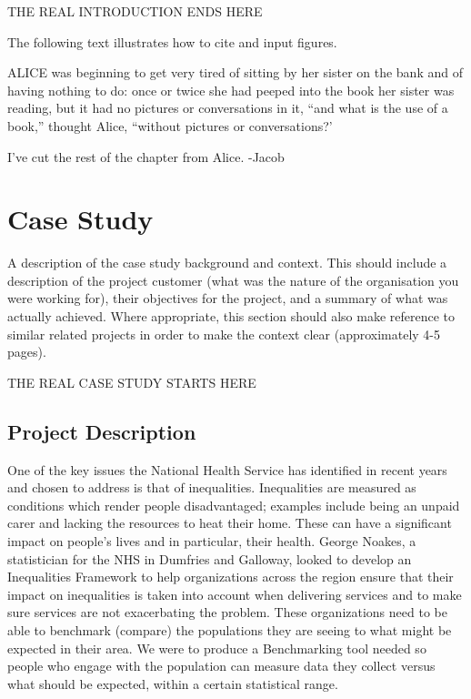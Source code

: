 \documentclass{l3proj}
\begin{document}
THE REAL INTRODUCTION ENDS HERE

The following text illustrates how to cite and input figures.

ALICE \cite{alice} was beginning to get very tired of sitting by her sister
on the bank and of having nothing to do: once or twice she had peeped into
the book her sister was reading, but it had no pictures or conversations in
it, ``and what is the use of a book,'' thought Alice, ``without pictures or
conversations?'



I've cut the rest of the chapter from Alice. -Jacob

\chapter{Case Study}
\label{case}

A description of the case study background and context. This should include a description of the project customer (what was the nature of the organisation you were working for), their objectives for the project, and a summary of what was actually achieved. Where appropriate, this section should also make reference to similar related projects in order to make the context clear (approximately 4-5 pages).

THE REAL CASE STUDY STARTS HERE

\section{Project Description}
\label{description}

One of the key issues the National Health Service has identified in recent years and chosen to address is that of inequalities. Inequalities are measured as conditions which render people disadvantaged; examples include being an unpaid carer and lacking the resources to heat their home. These can have a significant impact on people’s lives and in particular, their health. George Noakes, a statistician for the NHS in Dumfries and Galloway, looked to develop an Inequalities Framework to help organizations across the region ensure that their impact on inequalities is taken into account when delivering services and to make sure services are not exacerbating the problem. These organizations need to be able to benchmark (compare) the populations they are seeing to what might be expected in their area. We were to produce a Benchmarking tool needed so people who engage with the population can measure data they collect versus what should be expected, within a certain statistical range.
\end{document}
